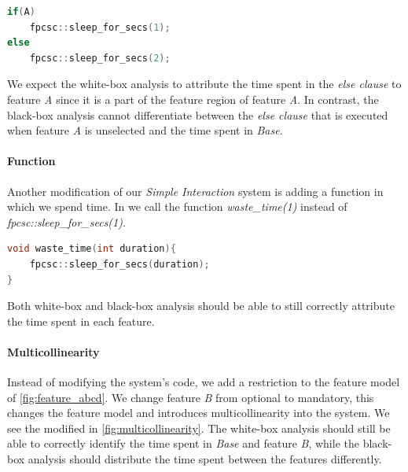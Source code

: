 \begin{minipage}{\linewidth}
    \begin{lstlisting}[language=C++,label={lst:else_case},escapechar=|]
if(A)
    fpcsc::sleep_for_secs(1); 
else
    fpcsc::sleep_for_secs(2);
    \end{lstlisting}
    \end{minipage}

We expect the white-box analysis to attribute the time spent in the \emph{else clause} to feature \emph{A} 
since it is a part of the feature region of feature \emph{A}. 
In contrast, 
the black-box analysis cannot differentiate between the \emph{else clause} that is executed when feature \emph{A} is unselected and the time spent in \emph{Base}.

\paragraph{Function}\label{ground-truth:Function}
Another modification of our \emph{Simple Interaction} system is adding a function in which we spend time. 
In  we call the function \emph{waste\_time(1)} instead of \emph{fpcsc::sleep\_for\_secs(1)}.

\begin{minipage}{\linewidth}
\begin{lstlisting}[language=C++,label={lst:function},escapechar=|]
void waste_time(int duration){
    fpcsc::sleep_for_secs(duration);
}
\end{lstlisting}
\end{minipage}

Both white-box and black-box analysis should be able to still correctly attribute the time spent in each feature.

\paragraph{Multicollinearity}\label{ground-truth:Multicollinearity}
Instead of modifying the system's code, we add a restriction to the feature model of \autoref{fig:feature_abcd}. 
We change feature \emph{B} from optional to mandatory, this changes the feature model and 
introduces multicollinearity into the system. 
We see the modified in \autoref{fig:multicollinearity}.
The white-box analysis should still be able to correctly identify the time spent in \emph{Base} and feature \emph{B}, 
while the black-box analysis should distribute the time spent between the features differently.

